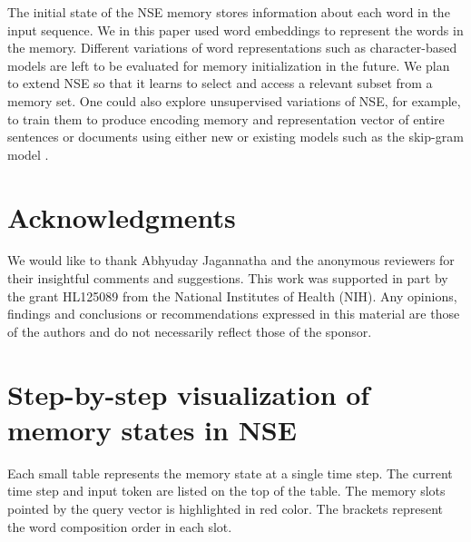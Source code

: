 \documentclass{article}
\begin{document}
The initial state of the NSE memory stores information about each word in the input sequence. We in this paper used word embeddings to represent the words in the memory. Different variations of word representations such as character-based models are left to be evaluated for memory initialization in the future. We plan to extend NSE so that it learns to select and access a relevant subset from a memory set.
One could also explore unsupervised variations of NSE, for example, to train them to produce encoding memory and representation vector of entire sentences or documents using either new or existing models such as the skip-gram model \cite{mikolov:13}.

\section*{Acknowledgments}

We would like to thank Abhyuday Jagannatha and the anonymous reviewers for
their insightful comments and suggestions.
This work was supported in part by the grant HL125089 from the National Institutes of Health (NIH). Any opinions, findings and conclusions or recommendations expressed in this material are those of the authors and do not necessarily 
reflect those of the sponsor.

\begingroup
	\small
	\setlength{\bibsep}{0pt plus 0.3ex}
	
	
\endgroup

\newpage

\appendix
\section{Step-by-step visualization of memory states in NSE}
\label{sup:mem}
Each small table represents the memory state at a single time step. The current time step and input token are listed on the top of the table. The memory slots pointed by the query vector is highlighted in red color. The brackets represent the word composition order in each slot.
\end{document}
